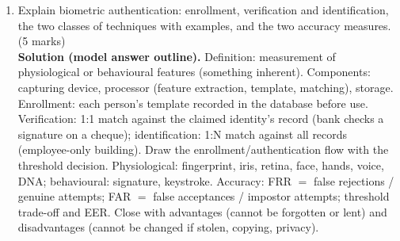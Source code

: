 \begin{enumerate}[leftmargin=1.6em,itemsep=4pt]
  \item Explain biometric authentication: enrollment, verification and identification, the two classes of techniques with examples, and the two accuracy measures. \hfill (5 marks)\\
  \textbf{Solution (model answer outline).} Definition: measurement of physiological or behavioural features (something inherent). Components: capturing device, processor (feature extraction, template, matching), storage. Enrollment: each person's template recorded in the database before use. Verification: 1:1 match against the claimed identity's record (bank checks a signature on a cheque); identification: 1:N match against all records (employee-only building). Draw the enrollment/authentication flow with the threshold decision. Physiological: fingerprint, iris, retina, face, hands, voice, DNA; behavioural: signature, keystroke. Accuracy: FRR $=$ false rejections / genuine attempts; FAR $=$ false acceptances / impostor attempts; threshold trade-off and EER. Close with advantages (cannot be forgotten or lent) and disadvantages (cannot be changed if stolen, copying, privacy).
\end{enumerate}
